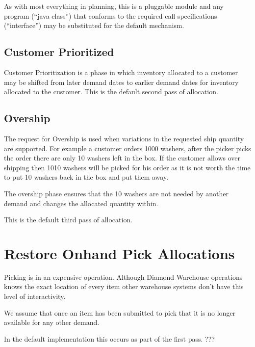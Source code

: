 As with most everything in planning, this is a pluggable module and any program (``java class'') that conforms to 
the required call specifications (``interface'') may be substituted for the default mechanism.
\subsection{Customer Prioritized}
Customer Prioritization is a phase in which inventory allocated to a customer may be shifted 
from later demand dates to earlier demand dates for inventory allocated to the customer.
This is the default second pass of allocation.
\subsection{Overship}
The request for Overship is used when variations in the requested ship quantity
are supported.  For example a customer orders
1000 washers, after the picker picks the order there are only 10 washers left in
the box.  If the customer allows over shipping then 1010 
washers will be picked for his order as it is not worth the time to put 10
washers back in the box and put them away.

The overship phase ensures that the 10 washers are not needed by another demand
and changes the allocated quantity within.

This is the default third pass of allocation. 
\section{Restore Onhand Pick Allocations}
Picking is in an expensive operation.  Although Diamond Warehouse operations knows the exact location of 
every item other warehouse systems don't have this level of interactivity.

We assume that once an item has been submitted to pick that it is no longer available for any other demand.

In the default implementation this occurs as part of the first pass. ???